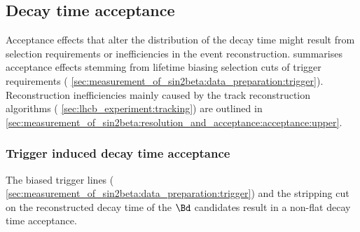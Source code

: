 \subsection{Decay time acceptance}
\label{sec:measurement_of_sin2beta:resolution_and_acceptance:acceptance}

Acceptance effects that alter the distribution of the decay time might result
from selection requirements or inefficiencies in the event reconstruction.
summarises acceptance effects stemming from lifetime biasing selection cuts of
trigger requirements (\cf
\cref{sec:measurement_of_sin2beta:data_preparation:trigger}). Reconstruction
inefficiencies mainly caused by the \VELO track reconstruction algorithms (\cf
\cref{sec:lhcb_experiment:tracking}) are outlined in
\cref{sec:measurement_of_sin2beta:resolution_and_acceptance:acceptance:upper}.

\subsubsection{Trigger induced decay time acceptance}
\label{sec:measurement_of_sin2beta:resolution_and_acceptance:acceptance:lower}

The biased trigger lines (\cf
\cref{sec:measurement_of_sin2beta:data_preparation:trigger}) and the stripping
cut on the reconstructed decay time of the $\Bd$ candidates result in a non-flat
decay time acceptance.

